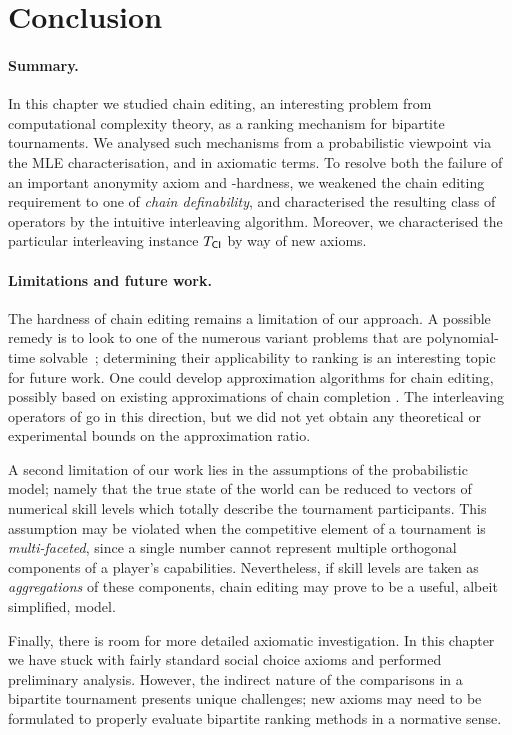 \section{Conclusion}
\label{tourn_sec_conclusion}

\paragraph{Summary.}
%
In this chapter we studied chain editing, an interesting problem from
computational complexity theory, as a ranking mechanism for bipartite
tournaments. We analysed such mechanisms from a probabilistic viewpoint via the
MLE characterisation, and in axiomatic terms. To resolve both the failure of an
important anonymity axiom and -hardness, we weakened the
chain editing requirement to one of \emph{chain definability}, and
characterised the resulting class of operators by the intuitive interleaving
algorithm. Moreover, we characterised the particular interleaving instance
${T_{\mathsf{CI}}}$ by way of new axioms.

\paragraph{Limitations and future work.}
%
The hardness of chain editing remains a limitation of our approach. A possible
remedy is to look to one of the numerous variant problems that are
polynomial-time solvable~\cite{jiao2017algorithms}; determining their
applicability to ranking is an interesting topic for future work. One could
develop approximation algorithms for chain editing, possibly based on existing
approximations of chain completion \cite{natanzon2000polynomial}. The
interleaving operators of  go in this direction, but we
did not yet obtain any theoretical or experimental bounds on the approximation
ratio.

A second limitation of our work lies in the assumptions of the probabilistic
model; namely that the true state of the world can be reduced to vectors of
numerical skill levels which totally describe the tournament participants. This
assumption may be violated when the competitive element of a tournament is
\emph{multi-faceted}, since a single number cannot represent multiple
orthogonal components of a player's capabilities. Nevertheless, if skill levels
are taken as \emph{aggregations} of these components, chain editing may prove
to be a useful, albeit simplified, model.

Finally, there is room for more detailed axiomatic investigation. In this
chapter
we have stuck with fairly standard social choice axioms and performed
preliminary analysis. However, the indirect nature of the comparisons in a
bipartite tournament presents unique challenges; new axioms may need to be
formulated to properly evaluate bipartite ranking methods in a normative
sense.
